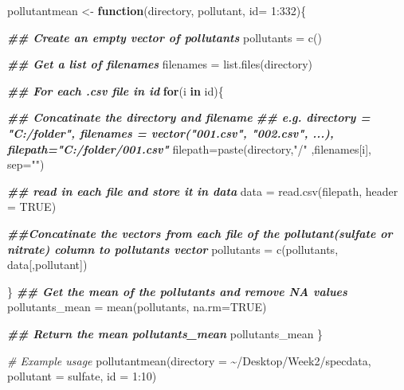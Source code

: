 \documentclass[
]{article}
\newenvironment{Shaded}{\begin{snugshade}}{\end{snugshade}}
\newcommand{\AttributeTok}[1]{\textcolor[rgb]{0.77,0.63,0.00}{#1}}
\newcommand{\CommentTok}[1]{\textcolor[rgb]{0.56,0.35,0.01}{\textit{#1}}}
\newcommand{\ConstantTok}[1]{\textcolor[rgb]{0.00,0.00,0.00}{#1}}
\newcommand{\ControlFlowTok}[1]{\textcolor[rgb]{0.13,0.29,0.53}{\textbf{#1}}}
\newcommand{\DecValTok}[1]{\textcolor[rgb]{0.00,0.00,0.81}{#1}}
\newcommand{\DocumentationTok}[1]{\textcolor[rgb]{0.56,0.35,0.01}{\textbf{\textit{#1}}}}
\newcommand{\FunctionTok}[1]{\textcolor[rgb]{0.00,0.00,0.00}{#1}}
\newcommand{\NormalTok}[1]{#1}
\newcommand{\OtherTok}[1]{\textcolor[rgb]{0.56,0.35,0.01}{#1}}
\newcommand{\SpecialCharTok}[1]{\textcolor[rgb]{0.00,0.00,0.00}{#1}}
\newcommand{\StringTok}[1]{\textcolor[rgb]{0.31,0.60,0.02}{#1}}
\begin{document}
\begin{Shaded}
\begin{Highlighting}[]
\NormalTok{pollutantmean }\OtherTok{\textless{}{-}} \ControlFlowTok{function}\NormalTok{(directory, pollutant, }\AttributeTok{id=} \DecValTok{1}\SpecialCharTok{:}\DecValTok{332}\NormalTok{)\{}
  
  \DocumentationTok{\#\# Create an empty vector of pollutants}
\NormalTok{  pollutants }\OtherTok{=} \FunctionTok{c}\NormalTok{()}
  
  \DocumentationTok{\#\# Get a list of filenames}
\NormalTok{  filenames }\OtherTok{=} \FunctionTok{list.files}\NormalTok{(directory)}
  
  \DocumentationTok{\#\# For each .csv file in id}
  \ControlFlowTok{for}\NormalTok{(i }\ControlFlowTok{in}\NormalTok{ id)\{}
    
    \DocumentationTok{\#\# Concatinate the directory and filename}
    \DocumentationTok{\#\# e.g. directory = "C:/folder", filenames = vector("001.csv", "002.csv", ...), filepath="C:/folder/001.csv"}
\NormalTok{    filepath}\OtherTok{=}\FunctionTok{paste}\NormalTok{(directory,}\StringTok{"/"}\NormalTok{ ,filenames[i], }\AttributeTok{sep=}\StringTok{""}\NormalTok{)}
    
    \DocumentationTok{\#\# read in each file and store it in data}
\NormalTok{    data }\OtherTok{=} \FunctionTok{read.csv}\NormalTok{(filepath, }\AttributeTok{header =} \ConstantTok{TRUE}\NormalTok{)}
    
    \DocumentationTok{\#\#Concatinate the vectors from each file of the pollutant(\textquotesingle{}sulfate\textquotesingle{} or \textquotesingle{}nitrate\textquotesingle{}) column to pollutants vector}
\NormalTok{    pollutants }\OtherTok{=} \FunctionTok{c}\NormalTok{(pollutants, data[,pollutant])}
    
\NormalTok{  \}}
  \DocumentationTok{\#\# Get the mean of the pollutants and remove NA values}
\NormalTok{  pollutants\_mean }\OtherTok{=} \FunctionTok{mean}\NormalTok{(pollutants, }\AttributeTok{na.rm=}\ConstantTok{TRUE}\NormalTok{)}
  
  \DocumentationTok{\#\# Return the mean \textquotesingle{}pollutants\_mean\textquotesingle{}}
\NormalTok{  pollutants\_mean}
\NormalTok{\}}

\CommentTok{\# Example usage}
\FunctionTok{pollutantmean}\NormalTok{(}\AttributeTok{directory =} \StringTok{\textquotesingle{}\textasciitilde{}/Desktop/Week2/specdata\textquotesingle{}}\NormalTok{, }\AttributeTok{pollutant =} \StringTok{\textquotesingle{}sulfate\textquotesingle{}}\NormalTok{, }\AttributeTok{id =} \DecValTok{1}\SpecialCharTok{:}\DecValTok{10}\NormalTok{)}


\end{Highlighting}
\end{Shaded}
\end{document}
